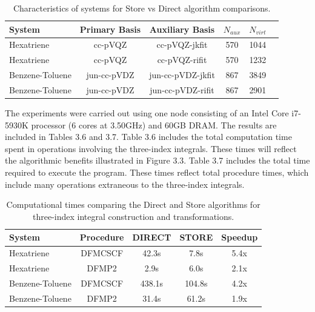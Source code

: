 \begingroup
\begin{table}[H]
\centering
\renewcommand{\baselinestretch}{1}
\caption{Characteristics of systems for Store vs Direct algorithm comparisons.}
\begin{tabular}{l ccccc}
\multicolumn{1}{l}{\textbf{System}} &
\multicolumn{1}{c}{\textbf{Primary Basis}} &
\multicolumn{1}{c}{\textbf{Auxiliary Basis}} &
\multicolumn{1}{c}{\textbf{$N_{aux}$}} &
\multicolumn{1}{c}{\textbf{$N_{virt}$}} \\
\hline
Hexatriene        & cc-pVQZ     & cc-pVQZ-jkfit     & 570   &  1044        \\ 
Hexatriene        & cc-pVQZ     & cc-pVQZ-rifit     & 570   &  1232        \\ 
Benzene-Toluene   & jun-cc-pVDZ & jun-cc-pVDZ-jkfit & 867   &  3849       \\ 
Benzene-Toluene   & jun-cc-pVDZ & jun-cc-pVDZ-rifit & 867   &  2901       \\ 
\end{tabular}
\end{table}
\endgroup

The experiments were carried out using one node consisting of an Intel Core i7-5930K processor
(6 cores at 3.50GHz) and 60GB DRAM. The results are included in Tables 3.6 and 3.7. Table 3.6 includes
the total computation time spent in operations involving the three-index integrals. These times will
reflect the algorithmic benefits illustrated in Figure 3.3. Table 3.7 includes the total time required
to execute the program. These times reflect total procedure times, which include many operations extraneous
to the three-index integrals.

\begingroup
\begin{table}[H]
\centering
\renewcommand{\baselinestretch}{1}
\caption{Computational times comparing the Direct and Store algorithms for three-index integral construction and
transformations.}
\begin{tabular}{l cccc}
\multicolumn{1}{l}{\textbf{System}} &
\multicolumn{1}{c}{\textbf{Procedure}} &
\multicolumn{1}{c}{\textbf{DIRECT}} &
\multicolumn{1}{c}{\textbf{STORE}} &
\multicolumn{1}{c}{\textbf{Speedup}} \\ 
\hline
Hexatriene        & DFMCSCF & 42.3s   &   7.8s  &  5.4x  \\ 
Hexatriene        & DFMP2   &  2.9s   &   6.0s  &  2.1x  \\ 
Benzene-Toluene   & DFMCSCF & 438.1s  & 104.8s  &  4.2x  \\ 
Benzene-Toluene   & DFMP2   & 31.4s   &  61.2s  &  1.9x  \\ 
\end{tabular}
\end{table}
\endgroup


